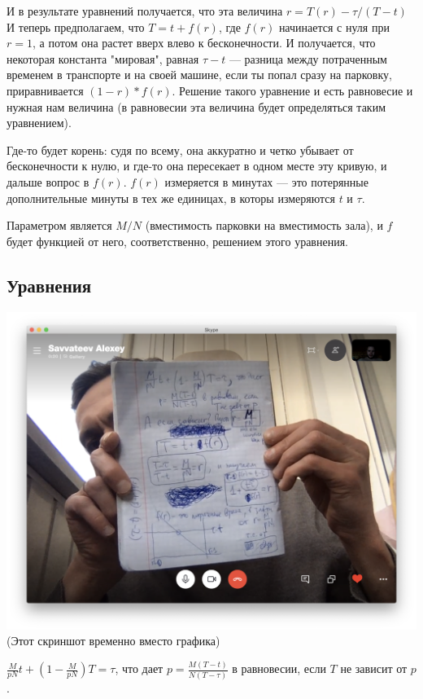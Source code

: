 И в результате уравнений получается, что эта величина $r = T(r) -  \tau/(T-t)$
И теперь предполагаем, что $T = t + f(r)$, где $f(r)$ начинается с нуля при $r = 1$, а потом она растет вверх влево к бесконечности. И получается, что некоторая константа "мировая", равная $\tau - t$ --- разница между потраченным временем в транспорте и на своей машине, если ты попал сразу на парковку, приравнивается $(1-r)*f(r)$. Решение такого уравнение и есть равновесие и нужная нам величина (в равновесии эта величина будет определяться таким уравнением).

Где-то будет корень: судя по всему, она аккуратно и четко убывает от бесконечности к нулю, и где-то она пересекает в одном месте эту кривую, и дальше вопрос в  $f(r)$. $f(r)$ измеряется в минутах --- это потерянные дополнительные минуты в тех же единицах, в которы измеряются $t$ и $\tau$.

Параметром является $M/N$ (вместимость парковки на вместимость зала), и $f$ будет функцией от него, соответственно, решением этого уравнения.


\subsection{Уравнения}
\includegraphics[scale=0.4]{img/tetrad2}
(Этот скриншот временно вместо графика)

$\frac{M}{pN} t + (1 - \frac{M}{pN}) T = \tau$,
что дает
$p=\frac{M(T-t)}{N(T-\tau)}$ в равновесии, если $T$ не зависит от $p$.

